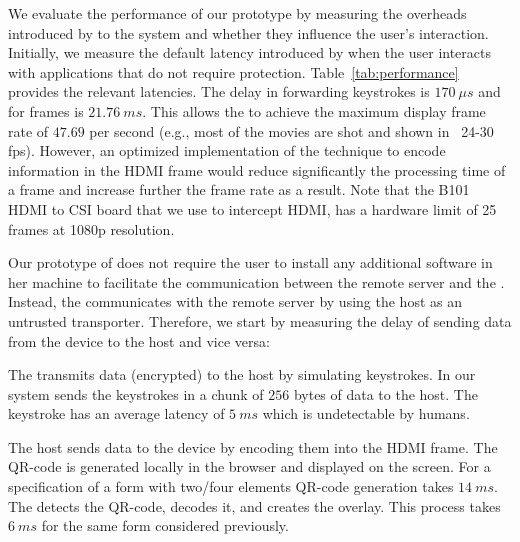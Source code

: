 
We evaluate the performance of our prototype by measuring the overheads introduced by \name to the system and whether they influence the user's interaction. 
Initially, we measure the default latency introduced by \device when the user interacts with applications that do not require protection. Table~\ref{tab:performance} provides the relevant latencies.
The delay in forwarding keystrokes is $170\ \mu s$ and for frames is $21.76\ ms$. This allows the \device to achieve the maximum display frame rate of $47.69$ per second (e.g., most of the movies are shot and shown in  ~24-30 fps). However, an optimized implementation of the technique to encode information in the HDMI frame would reduce significantly the processing time of a frame and increase further the frame rate as a result. Note that the B101 HDMI to CSI board that we use to intercept HDMI, has a hardware limit of 25 frames at 1080p resolution.

Our prototype of \name does not require the user to install any additional software in her machine to facilitate the communication between the remote server and the \device. Instead, the \device communicates with the remote server by using the host as an untrusted transporter. Therefore, we start by measuring the delay of sending data from the device to the host and vice versa:

\parasave
{} The \device transmits data (encrypted) to the host by simulating keystrokes. In our system \device sends the keystrokes in a chunk of $256$ bytes of data to the host. The keystroke has an average latency of $5\ ms$ which is undetectable by humans.  

\parasave
{} The host sends data to the device by encoding them into the HDMI frame. The QR-code is generated locally in the browser and displayed on the screen. For a specification of a form with two/four elements QR-code generation takes $14\ ms$. The \device detects the QR-code, decodes it, and creates the overlay. This process takes $6\ ms$ for the same form considered previously.
 

